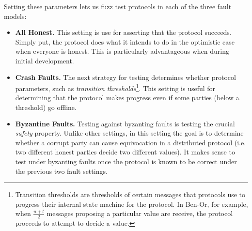 Setting these parameters lets us fuzz test protocols in each of the three fault models:
\begin{itemize}
  \item \textbf{All Honest.} This setting is use for asserting that the protocol succeeds. Simply put, the protocol does what it intends to do in the optimistic case when everyone is honest. This is particularly advantageous when during initial development. 
  \item \textbf{Crash Faults.} The next strategy for testing determines whether protocol parameters, such as \emph{transition thresholds}\footnote{Transition thresholds are thresholds of certain messages that protocols use to progress their internal state machine for the protocol. In Ben-Or, for example, when $\frac{n+t}{2}$ messages proposing a particular value are receive, the protocol proceeds to attempt to decide a value.}. This setting is useful for determining that the protocol makes progress even if some parties (below a threshold) go offline.
  \item \textbf{Byzantine Faults.} Testing against byzanting faults is testing the crucial \emph{safety} property. Unlike other settings, in this setting the goal is to determine whether a corrupt party can cause equivocation in a distributed protocol (i.e. two different honest parties decide two different values). It makes sense to test under byzanting faults once the protocol is known to be correct under the previous two fault settings. 
\end{itemize}

